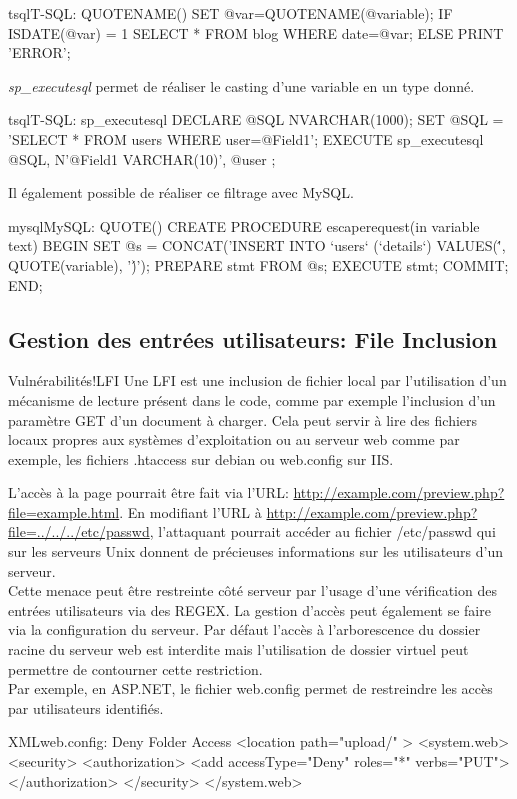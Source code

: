 \begin{Config}{tsql}{T-SQL: QUOTENAME()}
SET @var=QUOTENAME(@variable);
IF ISDATE(@var) = 1
  SELECT * FROM blog WHERE date=@var;
ELSE 
  PRINT 'ERROR';
\end{Config}
\textit{sp\_executesql} permet de réaliser le casting d'une variable en un type donné.
\begin{Config}{tsql}{T-SQL: sp\_executesql}
DECLARE @SQL NVARCHAR(1000);
SET @SQL = 'SELECT * FROM users WHERE user=@Field1';
EXECUTE sp_executesql @SQL, N'@Field1 VARCHAR(10)', @user ;
\end{Config}

Il également possible de réaliser ce filtrage avec MySQL.
\begin{Config}{mysql}{MySQL: QUOTE()}
CREATE PROCEDURE escaperequest(in variable text)
BEGIN    
    SET @s = CONCAT('INSERT INTO `users` (`details`) VALUES(\'', QUOTE(variable), '\')');
    PREPARE stmt FROM @s;
    EXECUTE stmt;
    COMMIT;
END;
\end{Config}


\subsection{Gestion des entrées utilisateurs: File Inclusion}
\begin{Define}{Vulnérabilités!LFI}
Une \gls{LFI} est une inclusion de fichier local par l'utilisation d'un mécanisme de lecture présent dans le code, comme par exemple l'inclusion d'un paramètre GET d'un document à charger. Cela peut servir à lire des fichiers locaux propres aux systèmes d'exploitation ou au serveur web comme par exemple, les fichiers .htaccess sur debian ou web.config sur IIS.
\end{Define}

L'accès à la page pourrait être fait via l'URL: \url{http://example.com/preview.php?file=example.html}. En modifiant l'URL à \url{http://example.com/preview.php?file=../../../etc/passwd}, l'attaquant pourrait accéder au fichier /etc/passwd qui sur les serveurs Unix donnent de précieuses informations sur les utilisateurs d'un serveur.\\

Cette menace peut être restreinte côté serveur par l'usage d'une vérification des entrées utilisateurs via des \gls{REGEX}. La gestion d'accès peut également se faire via la configuration du serveur. Par défaut l'accès à l'arborescence du dossier racine du serveur web est interdite mais l'utilisation de dossier virtuel peut permettre de contourner cette restriction.\\
Par exemple, en ASP.NET, le fichier web.config permet de restreindre les accès par utilisateurs identifiés.
\begin{Config}{XML}{web.config: Deny Folder Access}
<location path="upload/" >
<system.web>
	<security>
		<authorization>
			<add accessType="Deny" roles="*" verbs="PUT">
		</authorization>
	</security>
</system.web>
\end{Config}

